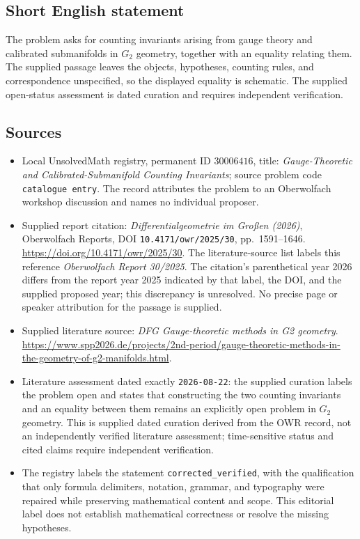 \documentclass[11pt]{article}
\begin{document}
\subsection{Short English statement}
The problem asks for counting invariants arising from gauge theory and calibrated submanifolds in \(G_2\) geometry, together with an equality relating them. The supplied passage leaves the objects, hypotheses, counting rules, and correspondence unspecified, so the displayed equality is schematic. The supplied open-status assessment is dated curation and requires independent verification.
\subsection{Sources}
\begin{itemize}
\item Local UnsolvedMath registry, permanent ID \(30006416\), title: \emph{Gauge-Theoretic and Calibrated-Submanifold Counting Invariants}; source problem code \texttt{catalogue entry}. The record attributes the problem to an Oberwolfach workshop discussion and names no individual proposer.
\item Supplied report citation: \emph{Differentialgeometrie im Großen (2026)}, Oberwolfach Reports, DOI \texttt{10.4171/owr/2025/30}, pp.\ 1591--1646. \url{https://doi.org/10.4171/owr/2025/30}. The literature-source list labels this reference \emph{Oberwolfach Report 30/2025}. The citation's parenthetical year 2026 differs from the report year 2025 indicated by that label, the DOI, and the supplied proposed year; this discrepancy is unresolved. No precise page or speaker attribution for the passage is supplied.
\item Supplied literature source: \emph{DFG Gauge-theoretic methods in G2 geometry}. \url{https://www.spp2026.de/projects/2nd-period/gauge-theoretic-methods-in-the-geometry-of-g2-manifolds.html}.
\item Literature assessment dated exactly \texttt{2026-08-22}: the supplied curation labels the problem open and states that constructing the two counting invariants and an equality between them remains an explicitly open problem in \(G_2\) geometry. This is supplied dated curation derived from the OWR record, not an independently verified literature assessment; time-sensitive status and cited claims require independent verification.
\item The registry labels the statement \texttt{corrected\_verified}, with the qualification that only formula delimiters, notation, grammar, and typography were repaired while preserving mathematical content and scope. This editorial label does not establish mathematical correctness or resolve the missing hypotheses.
\end{itemize}
\end{document}
